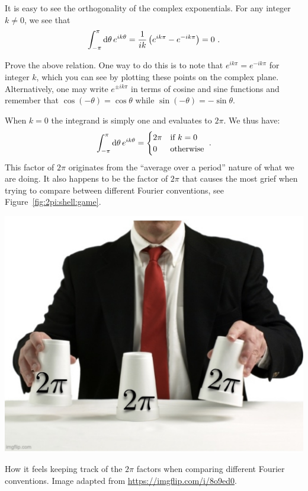 \documentclass[12pt, oneside]{report}    %
\begin{document}
It is easy to see the orthogonality of the complex exponentials. For any integer $k\neq 0$, we see that
\begin{align}
    \int_{-\pi}^\pi \operatorname{d}\!{\theta} \, e^{ik\theta}
    = \frac{1}{ik}
    \left(e^{ik\pi} - e^{-ik\pi}\right) = 0 \ .
\end{align}
\begin{exercise}
Prove the above relation. One way to do this is to note that $e^{ik\pi} = e^{-ik\pi}$  for integer $k$, which you can see by plotting these points on the complex plane. Alternatively, one may write $e^{\pm i k\pi}$ in terms of cosine and sine functions and remember that $\cos(-\theta) = \cos \theta$ while $\sin(-\theta) = -\sin\theta$.
\end{exercise}
When $k=0$ the integrand is simply one and evaluates to $2\pi$. We thus have:
\begin{align}
    \int_{-\pi}^\pi \operatorname{d}\!{\theta} \, e^{ik\theta}
    = 
    \begin{cases}
    2\pi &\textnormal{if } k=0\\
    0 &\textnormal{otherwise}
    \end{cases}
    \ .
\end{align}
This factor of $2\pi$ originates from the ``average over a period'' nature of what we are doing. It also happens to be the factor of $2\pi$ that causes the most grief when trying to compare between different Fourier conventions, see Figure~\ref{fig:2pi:shell:game}.
\begin{marginfigure}%
    \includegraphics[width=\textwidth]{figures/2piShellGame.jpg}
    \caption{How it feels keeping track of the $2\pi$ factors when comparing different Fourier conventions. Image adapted from \url{https://imgflip.com/i/8o9ed0}.}
    \label{fig:2pi:shell:game}
\end{marginfigure}
\end{document}
